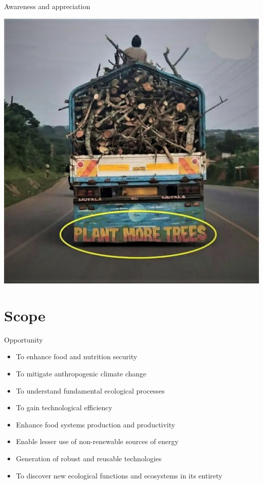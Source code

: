 \documentclass[
  ignorenonframetext,
  aspectratio=169]{beamer}
\providecommand{\tightlist}{%
  \setlength{\itemsep}{0pt}\setlength{\parskip}{0pt}}
\begin{document}
\begin{frame}{Awareness and appreciation}
\protect\hypertarget{awareness-and-appreciation}{}
\begin{center}\includegraphics[width=0.45\linewidth]{../images/plant_more_trees} \end{center}
\end{frame}

\hypertarget{scope}{%
\section{Scope}\label{scope}}

\begin{frame}{Opportunity}
\protect\hypertarget{opportunity}{}
\begin{itemize}
\tightlist
\item
  To enhance food and nutrition security
\item
  To mitigate anthropogenic climate change
\item
  To understand fundamental ecological processes
\item
  To gain technological efficiency
\item
  Enhance food systems production and productivity
\item
  Enable lesser use of non-renewable sources of energy
\item
  Generation of robust and reusable technologies
\item
  To discover new ecological functions and ecosystems in its entirety
\end{itemize}
\end{frame}
\end{document}
